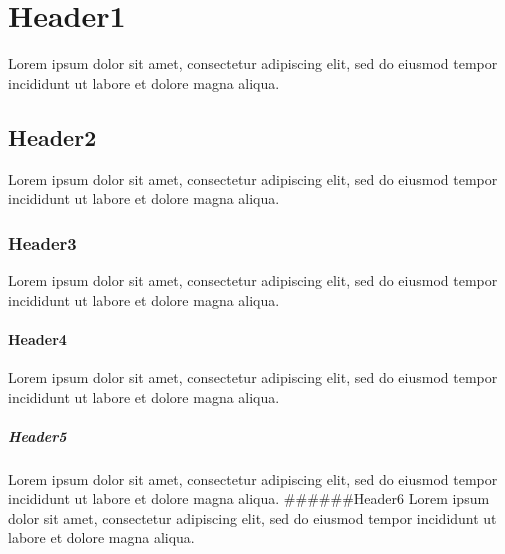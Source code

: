 \section{Header1}
Lorem ipsum dolor sit amet, consectetur adipiscing elit, sed do eiusmod tempor incididunt ut labore et dolore magna aliqua.
\subsection{Header2}
Lorem ipsum dolor sit amet, consectetur adipiscing elit, sed do eiusmod tempor incididunt ut labore et dolore magna aliqua.
\subsubsection{Header3}
Lorem ipsum dolor sit amet, consectetur adipiscing elit, sed do eiusmod tempor incididunt ut labore et dolore magna aliqua.
\paragraph{Header4}
Lorem ipsum dolor sit amet, consectetur adipiscing elit, sed do eiusmod tempor incididunt ut labore et dolore magna aliqua.
\subparagraph{Header5}
Lorem ipsum dolor sit amet, consectetur adipiscing elit, sed do eiusmod tempor incididunt ut labore et dolore magna aliqua.
######Header6
Lorem ipsum dolor sit amet, consectetur adipiscing elit, sed do eiusmod tempor incididunt ut labore et dolore magna aliqua.
